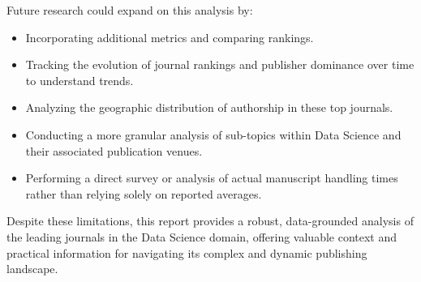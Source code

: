 \documentclass[../main.tex]{subfiles}
\begin{document}
\vspace{0.2cm}
\noindent
Future research could expand on this analysis by:

\begin{itemize}
    \item Incorporating additional metrics and comparing rankings.
    
    \item Tracking the evolution of journal rankings and publisher dominance over time to understand trends.

    \item Analyzing the geographic distribution of authorship in these top journals.

    \item Conducting a more granular analysis of sub-topics within Data Science and their associated publication venues.

    \item Performing a direct survey or analysis of actual manuscript handling times rather than relying solely on reported averages.
\end{itemize}

\vspace{0.2cm}
\noindent
Despite these limitations, this report provides a robust, data-grounded analysis of the leading journals in the Data Science domain, offering valuable context and practical information for navigating its complex and dynamic publishing landscape.
\end{document}
